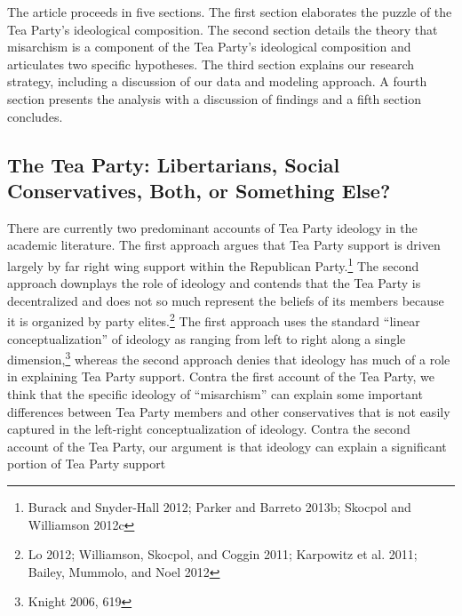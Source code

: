\documentclass[12pt,]{article}
\begin{document}
The article proceeds in five sections. The first section elaborates the
puzzle of the Tea Party's ideological composition. The second section
details the theory that misarchism is a component of the Tea Party's
ideological composition and articulates two specific hypotheses. The
third section explains our research strategy, including a discussion of
our data and modeling approach. A fourth section presents the analysis
with a discussion of findings and a fifth section concludes.

\subsection{The Tea Party: Libertarians, Social Conservatives, Both, or
Something
Else?}\label{the-tea-party-libertarians-social-conservatives-both-or-something-else}

There are currently two predominant accounts of Tea Party ideology in
the academic literature. The first approach argues that Tea Party
support is driven largely by far right wing support within the
Republican Party.\footnote{Burack and Snyder-Hall 2012; Parker and
  Barreto 2013b; Skocpol and Williamson 2012c} The second approach
downplays the role of ideology and contends that the Tea Party is
decentralized and does not so much represent the beliefs of its members
because it is organized by party elites.\footnote{Lo 2012; Williamson,
  Skocpol, and Coggin 2011; Karpowitz et al. 2011; Bailey, Mummolo, and
  Noel 2012} The first approach uses the standard ``linear
conceptualization'' of ideology as ranging from left to right along a
single dimension,\footnote{Knight 2006, 619} whereas the second approach
denies that ideology has much of a role in explaining Tea Party support.
Contra the first account of the Tea Party, we think that the specific
ideology of ``misarchism'' can explain some important differences
between Tea Party members and other conservatives that is not easily
captured in the left-right conceptualization of ideology. Contra the
second account of the Tea Party, our argument is that ideology can
explain a significant portion of Tea Party support
\end{document}

